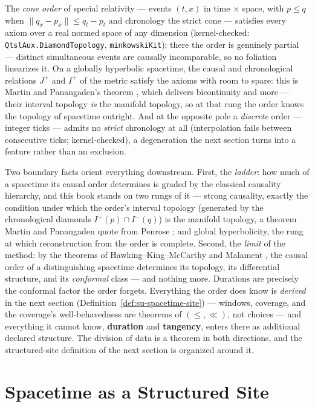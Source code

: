 The \emph{cone order} of special relativity --- events $(t, x)$ in time
$\times$ space, with $p \le q$ when $\lVert q_x - p_x \rVert \le q_t - p_t$ and
chronology the strict cone --- satisfies every axiom over a real normed space
of any dimension (kernel-checked: \texttt{QtslAux.DiamondTopology},
\texttt{minkowskiKit}); there the order is genuinely partial --- distinct
simultaneous events are causally incomparable, so no foliation linearizes it.
On a globally hyperbolic spacetime, the causal and chronological relations
$J^+$ and $I^+$ of the metric satisfy the axioms with room to spare: this is
Martin and Panangaden's theorem \cite{martin04}, which delivers bicontinuity
and more --- their interval topology \emph{is} the manifold topology, so at
that rung the order knows the topology of spacetime outright. And at the
opposite pole a \emph{discrete} order --- integer ticks --- admits no
\emph{strict} chronology at all (interpolation fails between consecutive ticks;
kernel-checked), a degeneration the next section turns into a feature rather
than an exclusion.

Two boundary facts orient everything downstream. First, the \emph{ladder}: how
much of a spacetime its causal order determines is graded by the classical
causality hierarchy, and this book stands on two rungs of it --- strong
causality, exactly the condition under which the order's interval topology
(generated by the chronological diamonds $I^+(p) \cap I^-(q)$) is the manifold
topology, a theorem Martin and Panangaden quote from Penrose \cite{martin04};
and global hyperbolicity, the rung at which reconstruction from the order is
complete. Second, the \emph{limit} of the method: by the theorems of
Hawking--King--McCarthy and Malament \cite{hkm76, malament77}, the causal order
of a distinguishing spacetime determines its topology, its differential
structure, and its \emph{conformal} class --- and nothing more. Durations are
precisely the conformal factor the order forgets. Everything the order does
know is \emph{derived} in the next section (Definition~\ref{def:su-spacetime-site})
--- windows, coverage, and the coverage's well-behavedness are theorems of
$(\le, \ll)$, not choices --- and everything it cannot know, \textbf{duration}
and \textbf{tangency}, enters there as additional declared structure. The
division of data is a theorem in both directions, and the structured-site
definition of the next section is organized around it.


\section{Spacetime as a Structured Site} \label{sec:su-site}

